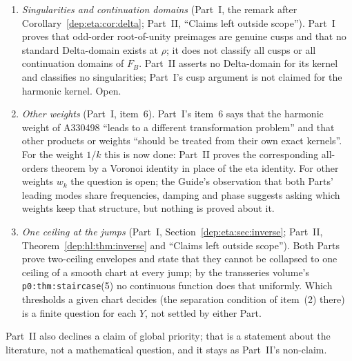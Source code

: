 \documentclass[11pt]{article}
\theoremstyle{definition}\newtheorem{definition}[theorem]{Definition}
\theoremstyle{remark}\newtheorem{remark}[theorem]{Remark}
\newcommand{\file}[1]{\nolinkurl{#1}}
\begin{document}
\begin{enumerate}
{exponentially improved expansions} (Part~I, item~5; Part~II, Scope and ``Claims
left outside scope''). The recipes are finite at every fixed order and say
nothing about the growth of the $H_j$ or $P_j$ as $j\to\infty$, optimal
truncation, or a complete transseries. Open.
\item\label{dep:q:cusps} \emph{Singularities and continuation domains}
(Part~I, the remark after Corollary~\ref{dep:eta:cor:delta}; Part~II,
``Claims left outside scope''). Part~I proves that odd-order root-of-unity
preimages are genuine cusps and that no standard Delta-domain exists at
$\rho$; it does not classify all cusps or all continuation domains of $F_B$.
Part~II asserts no Delta-domain for its kernel and classifies no
singularities; Part~I's cusp argument is not claimed for the harmonic kernel.
Open.
\item\label{dep:q:weights} \emph{Other weights} (Part~I, item~6). Part~I's
item~6 says that the harmonic weight of A330498 ``leads to a different
transformation problem'' and that other products or weights ``should be
treated from their own exact kernels''. For the weight $1/k$ this is now done:
Part~II proves the corresponding all-orders theorem by a Voronoi identity in
place of the eta identity. For other weights $w_k$ the question is open; the
Guide's observation that both Parts' leading modes share frequencies, damping
and phase suggests asking which weights keep that structure, but nothing is
proved about it.
\item\label{dep:q:jumps} \emph{One ceiling at the jumps} (Part~I,
Section~\ref{dep:eta:sec:inverse}; Part~II, Theorem~\ref{dep:hl:thm:inverse}
and ``Claims left outside scope''). Both Parts prove two-ceiling envelopes and
state that they cannot be collapsed to one ceiling of a smooth chart at every
jump; by the transseries volume's \file{p0:thm:staircase}(5) no continuous
function does that uniformly. Which thresholds a given chart decides (the
separation condition of item~(2) there) is a finite question for each $Y$, not
settled by either Part.
\end{enumerate}
Part~II also declines a claim of global priority; that is a statement about
the literature, not a mathematical question, and it stays as Part~II's
non-claim.
\end{document}
